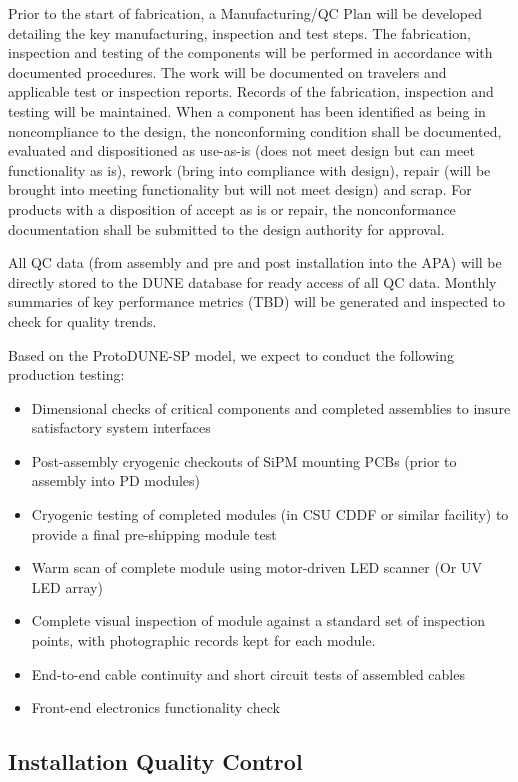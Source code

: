 Prior to the start of fabrication, a Manufacturing/QC Plan will be developed detailing the key manufacturing, inspection and test steps.  The fabrication, inspection and testing of the components will be performed in accordance with documented procedures. The work will be documented on travelers and applicable test or inspection reports. Records of the fabrication, inspection and testing will be maintained. When a component has been identified as being in noncompliance to the design, the nonconforming condition shall be documented, evaluated and dispositioned as use-as-is (does not meet design but can meet functionality as is), rework (bring into compliance with design), repair (will be brought into meeting functionality but will not meet design) and scrap. For products with a disposition of accept as is or repair, the nonconformance documentation shall be submitted to the design authority for approval.   

All QC data  (from assembly and pre and post installation into the APA) will be directly stored to the DUNE database for ready access of all QC data.  Monthly summaries of key performance metrics (TBD) will be generated and inspected to check for quality trends.

Based on the ProtoDUNE-SP model, we expect to conduct the following production testing:
\begin{itemize}
\item Dimensional checks of critical components and completed assemblies to insure satisfactory system interfaces
\item Post-assembly cryogenic checkouts of SiPM mounting PCBs (prior to assembly into PD modules)
\item Cryogenic testing of completed modules (in CSU CDDF or similar facility) to provide a final pre-shipping module test
\item Warm scan of complete module using motor-driven LED scanner (Or UV LED array)
\item Complete visual inspection of module against a standard set of inspection points, with photographic records kept for each module.
\item End-to-end cable continuity and short circuit tests of assembled cables
\item Front-end electronics functionality check
\end{itemize}

\subsection{Installation Quality Control}
\label{sec:fdsp-pd-prodqc}

